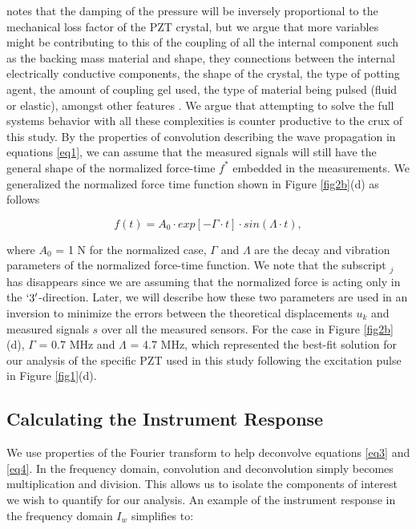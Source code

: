 \documentclass[preprint,3p, 11pt,authoryear]{elsarticle}
\begin{document}
{\citet{Christensen1988} notes that the damping of the pressure will be inversely proportional to the mechanical loss factor of the PZT crystal, but we argue that more variables might be contributing to this of the coupling of all the internal component such as the backing mass material and shape, they connections between the internal electrically conductive components, the shape of the crystal, the type of potting agent, the amount of coupling gel used, the type of material being pulsed (fluid or elastic), amongst other features \citep{Glaser1998}.  We argue that attempting to solve the full systems behavior with all these complexities is counter productive to the crux of this study. By the properties of convolution describing the wave propagation in equations \eqref{eq1}, we can assume that the measured signals will still have the general shape of the normalized force-time $f^{*}$ embedded in the measurements. We generalized the normalized force time function shown in Figure \ref{fig2b}(d) as follows

\begin{equation}
    \label{eq4b}
   f(t) = A_{0} \cdot exp[- \Gamma \cdot t]\cdot sin(\Lambda\cdot t) ,
\end{equation}

\noindent where $A_{0}$ = 1 N for the normalized case, $\Gamma$ and $\Lambda$ are the decay and vibration parameters of the normalized force-time function. We note that the subscript $_{j}$ has disappears since we are assuming that the normalized force is acting only in the $`3'$-direction. Later, we will describe how these two parameters are used in an inversion to minimize the errors between the theoretical displacements $u_{k}$ and measured signals $s$ over all the measured sensors. For the case in Figure \ref{fig2b}(d), $\Gamma$ = 0.7 MHz and $\Lambda$ = 4.7 MHz, which represented the best-fit solution for our analysis of the specific PZT used in this study following the excitation pulse in Figure \ref{fig1}(d).


\subsection{Calculating the Instrument Response}

We use properties of the Fourier transform \citep{Bracewell1986} to help deconvolve equations \eqref{eq3} and \eqref{eq4}.  In the frequency domain, convolution and deconvolution simply becomes multiplication and division. This allows us to isolate the components of interest we wish to quantify for our analysis. An example of the instrument response in the frequency domain $I_{w}$ simplifies to:

}
\end{document}

